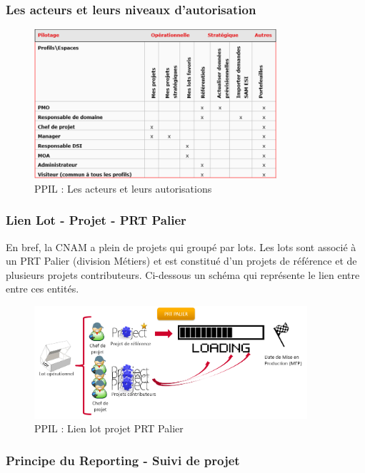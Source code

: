 \subsubsection{Les acteurs et leurs niveaux d'autorisation}
\begin{figure}[!h]
\centering
\includegraphics[width=0.8\textwidth]{images/ppil acteurs.png}
\caption{PPIL : Les acteurs et leurs autorisations}
\end{figure}

\subsubsection{Lien Lot - Projet - PRT Palier}

En bref, la CNAM a plein de projets qui groupé par lots. Les lots sont associé à un PRT Palier (division Métiers) et est constitué d'un projets de référence et de plusieurs projets contributeurs. Ci-dessous un schéma qui représente le lien entre entre ces entités.

\begin{figure}[!h]
\centering
\includegraphics[width=0.9\textwidth]{images/ppil-lien-lot-projet-prtpalier.png}
\caption{PPIL : Lien lot projet PRT Palier}
\end{figure}

\subsubsection{Principe du Reporting - Suivi de projet}

